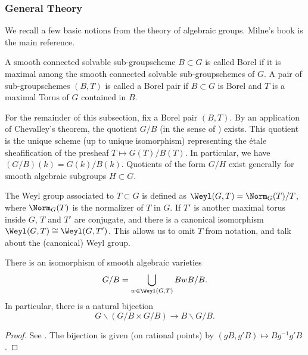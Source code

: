 \subsubsection{General Theory} %
\label{ssub:General Theory}

We recall a few basic notions from the theory of algebraic groups. Milne's book
\cite{milne2017reductive} is the main reference. 

\begin{defi}\label{def:BorelSubgrp}
  A smooth connected solvable sub-groupscheme $B \subset G$ is called Borel if it 
  is maximal among the smooth connected solvable sub-groupschemes of $G$. 
  A pair of sub-groupschemes $(B,T)$ is called a Borel pair if $B \subset G$ is 
  Borel and $T$ is a maximal Torus of $G$ contained in $B$.
\end{defi}
For the remainder of this subsection, fix a Borel pair $(B,T)$. By an application
of Chevalley's theorem, the quotient $G/B$ (in the sense of \cite{milne2017algebraic})
exists. This quotient is the unique scheme (up to unique isomorphism) representing
the \'etale sheafification of the presheaf $T \mapsto G(T)/B(T)$. In particular,
we have $(G/B)(k) = G(k)/B(k)$. Quotients of the form $G/H$ exist generally for
smooth algebraic subgroups $H \subset G$. 
\begin{defi}\label{def:WeylGroup}
  The Weyl group associated to $T \subset G$ is defined as $\Weyl(G,T) =
  \Norm_G(T)/T$, where $\Norm_G(T)$ is the normalizer of $T$ in $G$. 
  If $T'$ is another maximal torus inside $G$, $T$ and $T'$ are conjugate,
  and there is a canonical isomorphism $\Weyl(G,T) \cong \Weyl(G,T')$. 
  This allows us to omit $T$ from notation, and talk about the (canonical)
  Weyl group.
\end{defi}

\begin{thm}\label{thm:BruhatDecomposition}
  There is an isomorphism of smooth algebraic varieties
  \begin{equation*}
    G / B = \bigcup_{w \in \Weyl(G,T)} B w B/B.
  \end{equation*}
  In particular, there is a natural bijection
  \begin{equation*}
    G \backslash ( G / B \times G / B ) \to B \backslash G / B.
  \end{equation*}
\begin{proof}
  See \cite[Section 20.h]{milne2017algebraic}. The bijection is given (on
  rational points) by $(gB, g'B) \mapsto  B g^{-1} g' B$. 
\end{proof}
\end{thm}




